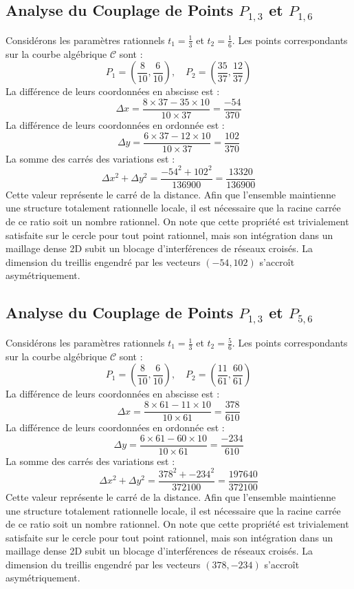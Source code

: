 \documentclass[12pt, a4paper]{article}
\begin{document}
\subsection{Analyse du Couplage de Points $P_{1,3}$ et $P_{1,6}$}
Considérons les paramètres rationnels $t_1 = \frac{1}{3}$ et $t_2 = \frac{1}{6}$.
Les points correspondants sur la courbe algébrique $\mathcal{C}$ sont :
$$ P_1 = \left( \frac{8}{10}, \frac{6}{10} \right), \quad P_2 = \left( \frac{35}{37}, \frac{12}{37} \right) $$
La différence de leurs coordonnées en abscisse est :
$$ \Delta x = \frac{8 \times 37 - 35 \times 10}{10 \times 37} = \frac{-54}{370} $$
La différence de leurs coordonnées en ordonnée est :
$$ \Delta y = \frac{6 \times 37 - 12 \times 10}{10 \times 37} = \frac{102}{370} $$
La somme des carrés des variations est :
$$ \Delta x^2 + \Delta y^2 = \frac{ -54^2 + 102^2 }{ 136900 } = \frac{ 13320 }{ 136900 } $$
Cette valeur représente le carré de la distance. Afin que l'ensemble maintienne une structure totalement rationnelle locale, il est nécessaire que la racine carrée de ce ratio soit un nombre rationnel. On note que cette propriété est trivialement satisfaite sur le cercle pour tout point rationnel, mais son intégration dans un maillage dense 2D subit un blocage d'interférences de réseaux croisés. La dimension du treillis engendré par les vecteurs $( -54, 102 )$ s'accroît asymétriquement.


\subsection{Analyse du Couplage de Points $P_{1,3}$ et $P_{5,6}$}
Considérons les paramètres rationnels $t_1 = \frac{1}{3}$ et $t_2 = \frac{5}{6}$.
Les points correspondants sur la courbe algébrique $\mathcal{C}$ sont :
$$ P_1 = \left( \frac{8}{10}, \frac{6}{10} \right), \quad P_2 = \left( \frac{11}{61}, \frac{60}{61} \right) $$
La différence de leurs coordonnées en abscisse est :
$$ \Delta x = \frac{8 \times 61 - 11 \times 10}{10 \times 61} = \frac{378}{610} $$
La différence de leurs coordonnées en ordonnée est :
$$ \Delta y = \frac{6 \times 61 - 60 \times 10}{10 \times 61} = \frac{-234}{610} $$
La somme des carrés des variations est :
$$ \Delta x^2 + \Delta y^2 = \frac{ 378^2 + -234^2 }{ 372100 } = \frac{ 197640 }{ 372100 } $$
Cette valeur représente le carré de la distance. Afin que l'ensemble maintienne une structure totalement rationnelle locale, il est nécessaire que la racine carrée de ce ratio soit un nombre rationnel. On note que cette propriété est trivialement satisfaite sur le cercle pour tout point rationnel, mais son intégration dans un maillage dense 2D subit un blocage d'interférences de réseaux croisés. La dimension du treillis engendré par les vecteurs $( 378, -234 )$ s'accroît asymétriquement.
\end{document}
